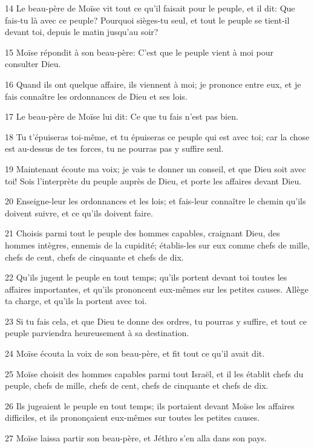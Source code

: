 \par 14 Le beau-père de Moïse vit tout ce qu'il faisait pour le peuple, et il dit: Que fais-tu là avec ce peuple? Pourquoi sièges-tu seul, et tout le peuple se tient-il devant toi, depuis le matin jusqu'au soir?
\par 15 Moïse répondit à son beau-père: C'est que le peuple vient à moi pour consulter Dieu.
\par 16 Quand ils ont quelque affaire, ils viennent à moi; je prononce entre eux, et je fais connaître les ordonnances de Dieu et ses lois.
\par 17 Le beau-père de Moïse lui dit: Ce que tu fais n'est pas bien.
\par 18 Tu t'épuiseras toi-même, et tu épuiseras ce peuple qui est avec toi; car la chose est au-dessus de tes forces, tu ne pourras pas y suffire seul.
\par 19 Maintenant écoute ma voix; je vais te donner un conseil, et que Dieu soit avec toi! Sois l'interprète du peuple auprès de Dieu, et porte les affaires devant Dieu.
\par 20 Enseigne-leur les ordonnances et les lois; et fais-leur connaître le chemin qu'ils doivent suivre, et ce qu'ils doivent faire.
\par 21 Choisis parmi tout le peuple des hommes capables, craignant Dieu, des hommes intègres, ennemis de la cupidité; établis-les sur eux comme chefs de mille, chefs de cent, chefs de cinquante et chefs de dix.
\par 22 Qu'ils jugent le peuple en tout temps; qu'ils portent devant toi toutes les affaires importantes, et qu'ils prononcent eux-mêmes sur les petites causes. Allège ta charge, et qu'ils la portent avec toi.
\par 23 Si tu fais cela, et que Dieu te donne des ordres, tu pourras y suffire, et tout ce peuple parviendra heureusement à sa destination.
\par 24 Moïse écouta la voix de son beau-père, et fit tout ce qu'il avait dit.
\par 25 Moïse choisit des hommes capables parmi tout Israël, et il les établit chefs du peuple, chefs de mille, chefs de cent, chefs de cinquante et chefs de dix.
\par 26 Ils jugeaient le peuple en tout temps; ils portaient devant Moïse les affaires difficiles, et ils prononçaient eux-mêmes sur toutes les petites causes.
\par 27 Moïse laissa partir son beau-père, et Jéthro s'en alla dans son pays.

